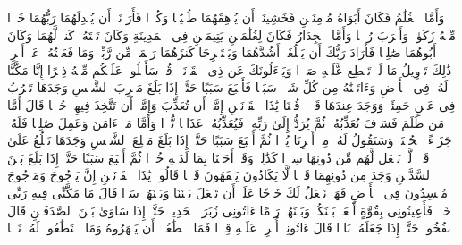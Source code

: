 \stopbuffer%
\startbuffer[\q:18:80]
وَأَمَّا ٱلۡغُلَٰمُ فَكَانَ أَبَوَاهُ مُؤۡمِنَیۡنِ فَخَشِینَاۤ أَن یُرۡهِقَهُمَا طُغۡیَٰنࣰا وَكُفۡرࣰا%
\stopbuffer%
\startbuffer[\q:18:81]
فَأَرَدۡنَاۤ أَن یُبۡدِلَهُمَا رَبُّهُمَا خَیۡرࣰا مِّنۡهُ زَكَوٰةࣰ وَأَقۡرَبَ رُحۡمࣰا%
\stopbuffer%
\startbuffer[\q:18:82]
وَأَمَّا ٱلۡجِدَارُ فَكَانَ لِغُلَٰمَیۡنِ یَتِیمَیۡنِ فِی ٱلۡمَدِینَةِ وَكَانَ تَحۡتَهُۥ كَنزࣱ لَّهُمَا وَكَانَ أَبُوهُمَا صَٰلِحࣰا فَأَرَادَ رَبُّكَ أَن یَبۡلُغَاۤ أَشُدَّهُمَا وَیَسۡتَخۡرِجَا كَنزَهُمَا رَحۡمَةࣰ مِّن رَّبِّكَۚ وَمَا فَعَلۡتُهُۥ عَنۡ أَمۡرِیۚ ذَٰلِكَ تَأۡوِیلُ مَا لَمۡ تَسۡطِع عَّلَیۡهِ صَبۡرࣰا%
\stopbuffer%
\startbuffer[\q:18:83]
وَیَسۡءَلُونَكَ عَن ذِی ٱلۡقَرۡنَیۡنِۖ قُلۡ سَأَتۡلُوا۟ عَلَیۡكُم مِّنۡهُ ذِكۡرًا%
\stopbuffer%
\startbuffer[\q:18:84]
إِنَّا مَكَّنَّا لَهُۥ فِی ٱلۡأَرۡضِ وَءَاتَیۡنَٰهُ مِن كُلِّ شَیۡءࣲ سَبَبࣰا%
\stopbuffer%
\startbuffer[\q:18:85]
فَأَتۡبَعَ سَبَبًا%
\stopbuffer%
\startbuffer[\q:18:86]
حَتَّىٰۤ إِذَا بَلَغَ مَغۡرِبَ ٱلشَّمۡسِ وَجَدَهَا تَغۡرُبُ فِی عَیۡنٍ حَمِئَةࣲ وَوَجَدَ عِندَهَا قَوۡمࣰاۖ قُلۡنَا یَٰذَا ٱلۡقَرۡنَیۡنِ إِمَّاۤ أَن تُعَذِّبَ وَإِمَّاۤ أَن تَتَّخِذَ فِیهِمۡ حُسۡنࣰا%
\stopbuffer%
\startbuffer[\q:18:87]
قَالَ أَمَّا مَن ظَلَمَ فَسَوۡفَ نُعَذِّبُهُۥ ثُمَّ یُرَدُّ إِلَىٰ رَبِّهِۦ فَیُعَذِّبُهُۥ عَذَابࣰا نُّكۡرࣰا%
\stopbuffer%
\startbuffer[\q:18:88]
وَأَمَّا مَنۡ ءَامَنَ وَعَمِلَ صَٰلِحࣰا فَلَهُۥ جَزَاۤءً ٱلۡحُسۡنَىٰۖ وَسَنَقُولُ لَهُۥ مِنۡ أَمۡرِنَا یُسۡرࣰا%
\stopbuffer%
\startbuffer[\q:18:89]
ثُمَّ أَتۡبَعَ سَبَبًا%
\stopbuffer%
\startbuffer[\q:18:90]
حَتَّىٰۤ إِذَا بَلَغَ مَطۡلِعَ ٱلشَّمۡسِ وَجَدَهَا تَطۡلُعُ عَلَىٰ قَوۡمࣲ لَّمۡ نَجۡعَل لَّهُم مِّن دُونِهَا سِتۡرࣰا%
\stopbuffer%
\startbuffer[\q:18:91]
كَذَٰلِكَۖ وَقَدۡ أَحَطۡنَا بِمَا لَدَیۡهِ خُبۡرࣰا%
\stopbuffer%
\startbuffer[\q:18:92]
ثُمَّ أَتۡبَعَ سَبَبًا%
\stopbuffer%
\startbuffer[\q:18:93]
حَتَّىٰۤ إِذَا بَلَغَ بَیۡنَ ٱلسَّدَّیۡنِ وَجَدَ مِن دُونِهِمَا قَوۡمࣰا لَّا یَكَادُونَ یَفۡقَهُونَ قَوۡلࣰا%
\stopbuffer%
\startbuffer[\q:18:94]
قَالُوا۟ یَٰذَا ٱلۡقَرۡنَیۡنِ إِنَّ یَأۡجُوجَ وَمَأۡجُوجَ مُفۡسِدُونَ فِی ٱلۡأَرۡضِ فَهَلۡ نَجۡعَلُ لَكَ خَرۡجًا عَلَىٰۤ أَن تَجۡعَلَ بَیۡنَنَا وَبَیۡنَهُمۡ سَدࣰّا%
\stopbuffer%
\startbuffer[\q:18:95]
قَالَ مَا مَكَّنِّی فِیهِ رَبِّی خَیۡرࣱ فَأَعِینُونِی بِقُوَّةٍ أَجۡعَلۡ بَیۡنَكُمۡ وَبَیۡنَهُمۡ رَدۡمًا%
\stopbuffer%
\startbuffer[\q:18:96]
ءَاتُونِی زُبَرَ ٱلۡحَدِیدِۖ حَتَّىٰۤ إِذَا سَاوَىٰ بَیۡنَ ٱلصَّدَفَیۡنِ قَالَ ٱنفُخُوا۟ۖ حَتَّىٰۤ إِذَا جَعَلَهُۥ نَارࣰا قَالَ ءَاتُونِیۤ أُفۡرِغۡ عَلَیۡهِ قِطۡرࣰا%
\stopbuffer%
\startbuffer[\q:18:97]
فَمَا ٱسۡطَٰعُوۤا۟ أَن یَظۡهَرُوهُ وَمَا ٱسۡتَطَٰعُوا۟ لَهُۥ نَقۡبࣰا%
\stopbuffer%
